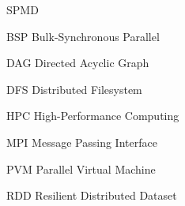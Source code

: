 \begin{listofabbrv}{SPMD}
	\item[BSP] Bulk-Synchronous Parallel
        \item[DAG] Directed Acyclic Graph
        \item[DFS] Distributed Filesystem
        \item[HPC] High-Performance Computing
        \item[MPI] Message Passing Interface
        \item[PVM] Parallel Virtual Machine
        \item[RDD] Resilient Distributed Dataset
\end{listofabbrv}


\listoffigures

\listoftables

\tableofcontents